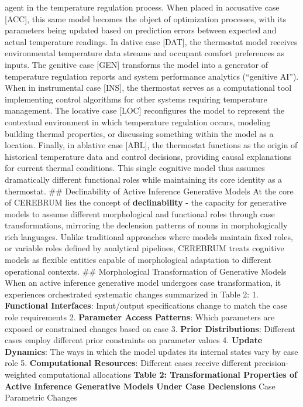 \documentclass[
  11pt,
  letterpaper,
]{article}
\begin{document}
agent in the temperature regulation process. When placed in accusative
case {[}ACC{]}, this same model becomes the object of optimization
processes, with its parameters being updated based on prediction errors
between expected and actual temperature readings. In dative case
{[}DAT{]}, the thermostat model receives environmental temperature data
streams and occupant comfort preferences as inputs. The genitive case
{[}GEN{]} transforms the model into a generator of temperature
regulation reports and system performance analytics (``genitive AI'').
When in instrumental case {[}INS{]}, the thermostat serves as a
computational tool implementing control algorithms for other systems
requiring temperature management. The locative case {[}LOC{]}
reconfigures the model to represent the contextual environment in which
temperature regulation occurs, modeling building thermal properties, or
discussing something within the model as a location. Finally, in
ablative case {[}ABL{]}, the thermostat functions as the origin of
historical temperature data and control decisions, providing causal
explanations for current thermal conditions. This single cognitive model
thus assumes dramatically different functional roles while maintaining
its core identity as a thermostat. \#\# Declinability of Active
Inference Generative Models At the core of CEREBRUM lies the concept of
\textbf{declinability} - the capacity for generative models to assume
different morphological and functional roles through case
transformations, mirroring the declension patterns of nouns in
morphologically rich languages. Unlike traditional approaches where
models maintain fixed roles, or variable roles defined by analytical
pipelines, CEREBRUM treats cognitive models as flexible entities capable
of morphological adaptation to different operational contexts. \#\#
Morphological Transformation of Generative Models When an active
inference generative model undergoes case transformation, it experiences
orchestrated systematic changes summarized in Table 2: 1.
\textbf{Functional Interfaces}: Input/output specifications change to
match the case role requirements 2. \textbf{Parameter Access Patterns}:
Which parameters are exposed or constrained changes based on case 3.
\textbf{Prior Distributions}: Different cases employ different prior
constraints on parameter values 4. \textbf{Update Dynamics}: The ways in
which the model updates its internal states vary by case role 5.
\textbf{Computational Resources}: Different cases receive different
precision-weighted computational allocations \textbf{Table 2:
Transformational Properties of Active Inference Generative Models Under
Case Declensions} \textbar{} Case \textbar{} Parametric Changes
\end{document}
